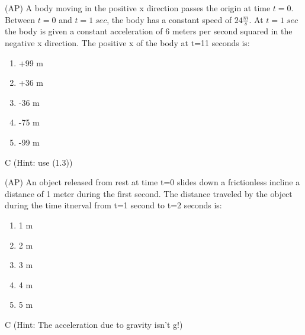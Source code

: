 \begin{question}
(AP) A body moving in the positive x direction passes the origin at time $t=0$. Between $t=0$ and $t=1\;sec$, the body has a constant speed of $24\frac{m}{s}$. At $t=1\;sec$ the body is given a constant acceleration of 6 meters per second squared in the negative x direction. The positive x of the body at t=11 seconds is:
\begin{multicols}{5}
\begin{enumerate}[label=(\alph*)]
    \item +99 m
    \item +36 m
    \item -36 m
    \item -75 m
    \item -99 m
\end{enumerate}
\end{multicols}
\end{question}

\begin{solution}
C (Hint: use (1.3))
\end{solution}


\begin{question}
(AP) An object released from rest at time t=0 slides down a frictionless incline a distance of 1 meter during the first second. The distance traveled by the object during the time itnerval from t=1 second to t=2 seconds is:
\begin{multicols}{5}
\begin{enumerate}[label=(\alph*)]
    \item 1 m
    \item 2 m
    \item 3 m
    \item 4 m
    \item 5 m
\end{enumerate}
\end{multicols}
\end{question}

\begin{solution}
C (Hint: The acceleration due to gravity isn't g!)
\end{solution}


